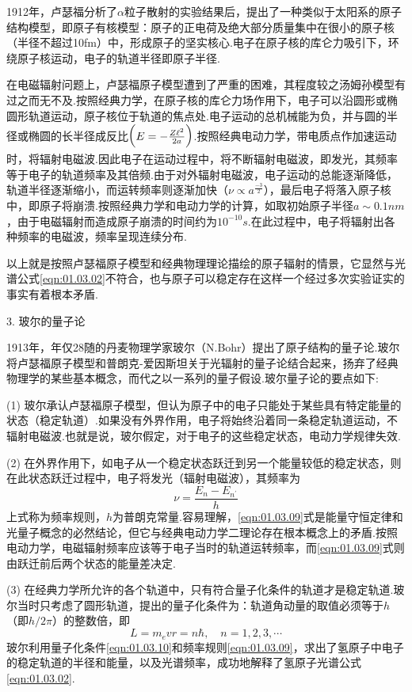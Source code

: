 1912年，卢瑟福分析了$\alpha$粒子散射的实验结果后，提出了一种类似于太阳系的原子结构模型，即原子有核模型：原子的正电荷及绝大部分质量集中在很小的原子核（半径不超过10\si{fm}）中，形成原子的坚实核心.电子在原子核的库仑力吸引下，环绕原子核运动，电子的轨道半径即原子半径.

在电磁辐射问题上，卢瑟福原子模型遭到了严重的困难，其程度较之汤姆孙模型有过之而无不及.按照经典力学，在原子核的库仑力场作用下，电子可以沿圆形或椭圆形轨道运动，原子核位于轨道的焦点处.电子运动的总机械能为负，并与圆的半径或椭圆的长半径成反比$\bigg(E=-\frac{Z\ell^{2}}{2a} \bigg)$.按照经典电动力学，带电质点作加速运动时，将辐射电磁波.因此电子在运动过程中，将不断辐射电磁波，即发光，其频率等于电子的轨道频率及其倍频.由于对外辐射电磁波，电子运动的总能逐渐降低，轨道半径逐渐缩小，而运转频率则逐渐加快（$\nu\propto a^{\frac{-3}{2}}$），最后电子将落入原子核中，即原子将崩溃.按照经典力学和电动力学的计算，如取初始原子半径$a\sim 0.1\si{nm}$，由于电磁辐射而造成原子崩溃的时间约为$10^{-10}\si{s}$.在此过程中，电子将辐射出各种频率的电磁波，频率呈现连续分布.

以上就是按照卢瑟福原子模型和经典物理理论描绘的原子辐射的情景，它显然与光谱公式\eqref{eqn:01.03.02}不符合，也与原子可以稳定存在这样一个经过多次实验证实的事实有着根本矛盾.

\textsf{3. 玻尔的量子论}

1913年，年仅28随的丹麦物理学家玻尔（N.Bohr）提出了原子结构的量子论.玻尔将卢瑟福原子模型和普朗克-爱因斯坦关于光辐射的量子论结合起来，扬弃了经典物理学的某些基本概念，而代之以一系列的量子假设.玻尔量子论的要点如下:

(1) 玻尔承认卢瑟福原子模型，但认为原子中的电子只能处于某些具有特定能量的状态（稳定轨道）.如果没有外界作用，电子将始终沿着同一条稳定轨道运动，不辐射电磁波.也就是说，玻尔假定，对于电子的这些稳定状态，电动力学规律失效.

(2) 在外界作用下，如电子从一个稳定状态跃迁到另一个能量较低的稳定状态，则在此状态跃迁过程中，电子将发光（辐射电磁波），其频率为
\eqshort
\begin{equation}\label{eqn:01.03.09}
	\nu=\frac{E_{n}-E_{n^{\prime}}}{h}
\end{equation}\eqnormal
上式称为频率规则，$h$为普朗克常量.容易理解，\eqref{eqn:01.03.09}式是能量守恒定律和光量子概念的必然结论，但它与经典电动力学二理论存在根本概念上的矛盾.按照电动力学，电磁辐射频率应该等于电子当时的轨道运转频率，而\eqref{eqn:01.03.09}式则由跃迁前后两个状态的能量差决定.

(3) 在经典力学所允许的各个轨道中，只有符合量子化条件的轨道才是稳定轨道.玻尔当时只考虑了圆形轨道，提出的量子化条件为：轨道角动量的取值必须等于$h$（即$h/2\pi$）的整数倍，即
\begin{equation}\label{eqn:01.03.10}
	L=m_{e}vr=n\hbar,\quad n=1,2,3,\cdots
\end{equation}\eqlong
玻尔利用量子化条件\eqref{eqn:01.03.10}和频率规则\eqref{eqn:01.03.09}，求出了氢原子中电子的稳定轨道的半径和能量，以及光谱频率，成功地解释了氢原子光谱公式\eqref{eqn:01.03.02}.

